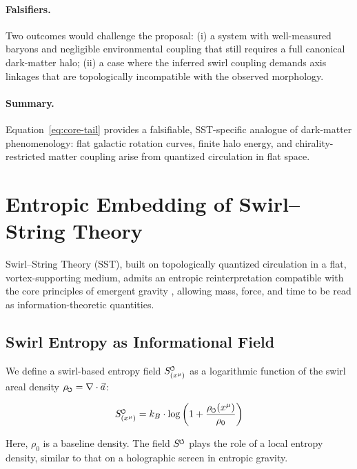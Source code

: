 \documentclass[11pt]{article}
\newcommand{\swirlarrow}{%
    \mathchoice{\mkern-2mu\scriptstyle\boldsymbol{\circlearrowleft}}%
    {\mkern-2mu\scriptstyle\boldsymbol{\circlearrowleft}}%
    {\mkern-2mu\scriptscriptstyle\boldsymbol{\circlearrowleft}}%
    {\mkern-2mu\scriptscriptstyle\boldsymbol{\circlearrowleft}}%
}
\begin{document}
    \paragraph{Falsifiers.}
    Two outcomes would challenge the proposal: (i) a system with well-measured baryons and negligible environmental coupling that still requires a full canonical dark-matter halo; (ii) a case where the inferred swirl coupling demands axis linkages that are topologically incompatible with the observed morphology.

    \paragraph{Summary.}
    Equation~\eqref{eq:core-tail} provides a falsifiable, SST-specific analogue of
    dark-matter phenomenology: flat galactic rotation curves, finite halo energy,
    and chirality-restricted matter coupling arise from quantized circulation in flat space.

\section{Entropic Embedding of Swirl–String Theory}
\label{sec:entropic-sst}
    Swirl–String Theory (SST), built on topologically quantized circulation in a flat, vortex-supporting medium, admits an entropic reinterpretation compatible with the core principles of emergent gravity \cite{verlinde2011origin,verlinde2016emergent,jacobson1995thermodynamics,padmanabhan2010thermodynamical,bekenstein1973black}, allowing mass, force, and time to be read as information-theoretic quantities.


    \subsection{Swirl Entropy as Informational Field}
        We define a swirl-based entropy field $S_{(x^\mu)}^{\swirlarrow} $ as a logarithmic function of the swirl areal density $\rho_{\swirlarrow} = \nabla \cdot \vec{a}$:

        \begin{equation}
            S_{(x^\mu)}^{\swirlarrow} = k_B \cdot \log\left(1 + \frac{\rho_{\swirlarrow}(x^\mu)}{\rho_0}\right)
        \end{equation}

        Here, $\rho_0$ is a baseline density. The field $S^{\swirlarrow} $ plays the role of a local entropy density, similar to that on a holographic screen in entropic gravity.
\end{document}
